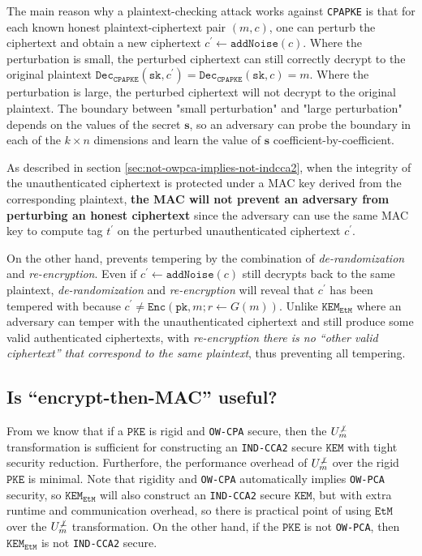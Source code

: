 \documentclass[floatrow,journal=tches,submission]{iacrtrans}
\newcommand{\monospace}{\texttt}
\newcommand{\pke}{\monospace{PKE}}
\newcommand{\encrypt}{\monospace{Enc}}
\newcommand{\decrypt}{\monospace{Dec}}
\newcommand{\kem}{\monospace{KEM}}
\newcommand{\etm}{\monospace{EtM}}  %
\newcommand{\pk}{\monospace{pk}}
\newcommand{\sk}{\monospace{sk}}
\begin{document}
The main reason why a plaintext-checking attack works against \monospace{CPAPKE} is that for each known honest plaintext-ciphertext pair $(m, c)$, one can perturb the ciphertext and obtain a new ciphertext $c^\prime \leftarrow \monospace{addNoise}(c)$. Where the perturbation is small, the perturbed ciphertext can still correctly decrypt to the original plaintext $\decrypt_\monospace{CPAPKE}(\sk, c^\prime) = \decrypt_\monospace{CPAPKE}(\sk, c) = m$. Where the perturbation is large, the perturbed ciphertext will not decrypt to the original plaintext. The boundary between "small perturbation" and "large perturbation" depends on the values of the secret $\mathbf{s}$, so an adversary can probe the boundary in each of the $k \times n$ dimensions and learn the value of $\mathbf{s}$ coefficient-by-coefficient.

As described in section \ref{sec:not-owpca-implies-not-indcca2}, when the integrity of the unauthenticated ciphertext is protected under a MAC key derived from the corresponding plaintext, \textbf{the MAC will not prevent an adversary from perturbing an honest ciphertext} since the adversary can use the same MAC key to compute tag $t^\prime$ on the perturbed unauthenticated ciphertext $c^\prime$.

On the other hand, \cite{hofheinz2017modular} prevents tempering by the combination of \emph{de-randomization} and \emph{re-encryption}. Even if $c^\prime \leftarrow \monospace{addNoise}(c)$ still decrypts back to the same plaintext, \emph{de-randomization} and \emph{re-encryption} will reveal that $c^\prime$ has been tempered with because $c^\prime \neq \encrypt(\pk, m; r\leftarrow G(m))$. Unlike $\kem_\etm$ where an adversary can temper with the unauthenticated ciphertext and still produce some valid authenticated ciphertexts, with \emph{re-encryption} \emph{there is no ``other valid ciphertext'' that correspond to the same plaintext}, thus preventing all tempering.

\subsection{Is ``encrypt-then-MAC'' useful?}
From \cite{hofheinz2017modular} we know that if a $\pke$ is rigid and \monospace{OW-CPA} secure, then the $U^{\not\bot}_m$ transformation is sufficient for constructing an \monospace{IND-CCA2} secure $\kem$ with tight security reduction. Furtherfore, the performance overhead of $U^{\not\bot}_m$ over the rigid $\pke$ is minimal. Note that rigidity and \monospace{OW-CPA} automatically implies \monospace{OW-PCA} security, so $\kem_\etm$ will also construct an \monospace{IND-CCA2} secure $\kem$, but with extra runtime and communication overhead, so there is practical point of using $\etm$ over the $U^{\not\bot}_m$ transformation. On the other hand, if the $\pke$ is not \monospace{OW-PCA}, then $\kem_\etm$ is not \monospace{IND-CCA2} secure.
\end{document}
